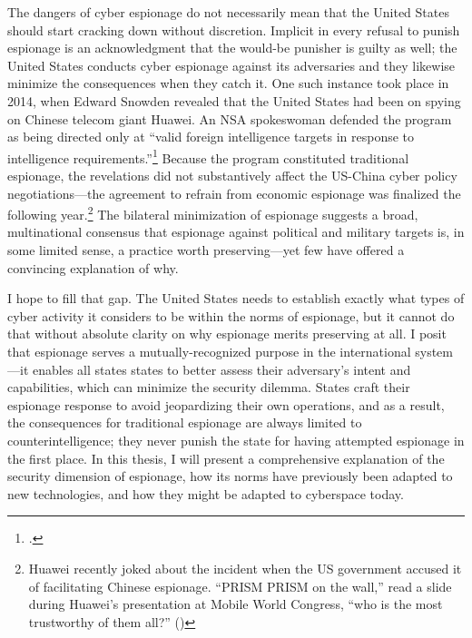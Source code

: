 \documentclass{memoir}
\begin{document}
\begin{refsegment}
The dangers of cyber espionage do not necessarily mean that the United States should start cracking down without discretion. Implicit in every refusal to punish espionage is an acknowledgment that the would-be punisher is guilty as well; the United States conducts cyber espionage against its adversaries and they likewise minimize the consequences when they catch it. One such instance took place in 2014, when Edward Snowden revealed that the United States had been on spying on Chinese telecom giant Huawei. An NSA spokeswoman defended the program as being directed only at ``valid foreign intelligence targets in response to intelligence requirements.''\footcite{nakashima_nsa_2014} Because the program constituted traditional espionage, the revelations did not substantively affect the US-China cyber policy negotiations---the agreement to refrain from economic espionage was finalized the following year.\footnote{Huawei recently joked about the incident when the US government accused it of facilitating Chinese espionage. ``PRISM PRISM on the wall,'' read a slide during Huawei's presentation at Mobile World Congress, ``who is the most trustworthy of them all?'' (\cite{nicola_huawei_2019})} The bilateral minimization of espionage suggests a broad, multinational consensus that espionage against political and military targets is, in some limited sense, a practice worth preserving---yet few have offered a convincing explanation of why.


I hope to fill that gap. The United States needs to establish exactly what types of cyber activity it considers to be within the norms of espionage, but it cannot do that without absolute clarity on why espionage merits preserving at all. I posit that espionage serves a mutually-recognized purpose in the international system---it enables all states states to better assess their adversary's intent and capabilities, which can minimize the security dilemma. States craft their espionage response to avoid jeopardizing their own operations, and as a result, the consequences for traditional espionage are always limited to counterintelligence; they never punish the state for having attempted espionage in the first place. In this thesis, I will present a comprehensive explanation of the security dimension of espionage, how its norms have previously been adapted to new technologies, and how they might be adapted to cyberspace today.


\end{refsegment}
\end{document}
